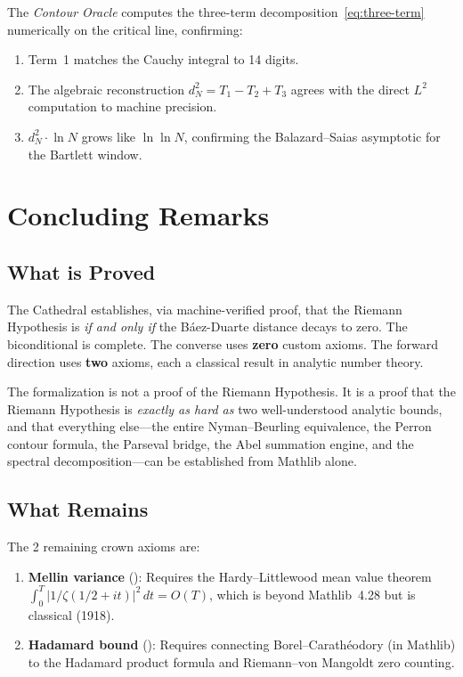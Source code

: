 \documentclass[11pt,a4paper]{article}
\begin{document}
The \emph{Contour Oracle} computes the three-term
decomposition~\eqref{eq:three-term} numerically on the critical line,
confirming:
\begin{enumerate}
  \item Term~1 matches the Cauchy integral to 14 digits.
  \item The algebraic reconstruction $d_N^2 = T_1 - T_2 + T_3$ agrees
    with the direct $L^2$ computation to machine precision.
  \item $d_N^2 \cdot \ln N$ grows like $\ln\ln N$, confirming the
    Balazard--Saias asymptotic for the Bartlett window.
\end{enumerate}

\section{Concluding Remarks}

\subsection{What is Proved}

The Cathedral establishes, via machine-verified proof, that the Riemann
Hypothesis is \emph{if and only if} the B\'aez-Duarte distance decays
to zero. The biconditional is complete. The converse uses \textbf{zero}
custom axioms. The forward direction uses \textbf{two} axioms, each a
classical result in analytic number theory.

The formalization is not a proof of the Riemann Hypothesis. It is
a proof that the Riemann Hypothesis is \emph{exactly as hard as}
two well-understood analytic bounds, and that everything else---the
entire Nyman--Beurling equivalence, the Perron contour formula, the
Parseval bridge, the Abel summation engine, and the spectral
decomposition---can be established from Mathlib alone.

\subsection{What Remains}

The 2 remaining crown axioms are:
\begin{enumerate}
  \item \textbf{Mellin variance} ():
    Requires the Hardy--Littlewood mean value theorem
    $\int_0^T |1/\zeta(1/2+it)|^2\,dt = O(T)$, which is beyond
    Mathlib~4.28 but is classical (1918).
  \item \textbf{Hadamard bound} ():
    Requires connecting Borel--Carath\'eodory (in Mathlib) to the
    Hadamard product formula and Riemann--von Mangoldt zero counting.
\end{enumerate}
\end{document}

